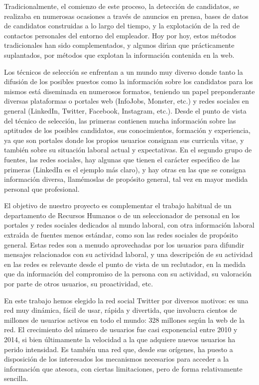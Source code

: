 Tradicionalmente, el comienzo de este proceso, la detecci\'on de candidatos, se realizaba en numerosas ocasiones 
a trav\'es de anuncios en prensa,
bases de datos de candidatos construidas a lo largo del tiempo, y la explotaci\'on de la red de contactos personales del entorno 
del empleador. Hoy por hoy, estos m\'etodos tradicionales han sido complementados, y algunos dir\'\i an que pr\'acticamente
suplantados, por m\'etodos que explotan la informaci\'on contenida en la web. 

Los t\'ecnicos de selecci\'on se enfrentan a un mundo muy diverso donde tanto la difusi\'on de los 
posibles puestos como la informaci\'on sobre los candidatos para los mismos est\'a diseminada en numerosos
formatos, teniendo un papel preponderante diversas plataformas o portales web (InfoJobs, Monster, etc.)
y redes sociales en general (LinkedIn, Twitter, Facebook, Instagram, etc.). Desde el punto de vista del t\'ecnico de selecci\'on, las
primeras contienen mucha informaci\'on sobre las aptitudes de los posibles candidatos, sus conocimientos, formaci\'on y 
experiencia, ya que son portales donde los propios usuarios consignan sus curricula vitae, y tambi\'en sobre su situaci\'on laboral
actual y expectativas. En el segundo grupo de fuentes, las redes sociales, hay algunas que tienen el car\'acter espec\'\i fico 
de las primeras (LinkedIn es el ejemplo m\'as claro), y hay otras en las que se consigna informaci\'on diversa, llam\'emoslas de 
prop\'osito general, tal vez en mayor medida personal que profesional.

El objetivo de nuestro proyecto es complementar el 
trabajo habitual de un departamento de Recursos Humanos o de un seleccionador de personal en
los portales y redes sociales dedicados al mundo laboral, con otra informaci\'on laboral extra\'\i da 
de fuentes menos est\'andar, como son las redes sociales de prop\'osito general. 
Estas redes son a menudo aprovechadas por los usuarios para difundir mensajes relacionados con su actividad
laboral, y una descripción de su actividad en las redes es relevante desde el punto de vista 
de un reclutador, en la medida que da informaci\'on del compromiso de la persona con su actividad, su valoración por
parte de otros usuarios, su proactividad, etc.

En este trabajo hemos elegido la red social Twitter por diversos motivos: es una red muy dinámica, fácil de usar, rápida y divertida,
que involucra cientos de millones de usuarios activos en todo el mundo: 328 millones según la web de la red. El crecimiento del número 
de usuarios fue casi exponencial entre 2010 y 2014, si bien últimamente la velocidad a la que adquiere nuevos usuarios ha perido intensidad.
Es también una red que, desde sus orígenes, ha puesto a disposición de los interesados los mecanismos necesarios para acceder a 
la información que atesora, con ciertas limitaciones, pero de forma relativamente sencilla. 



